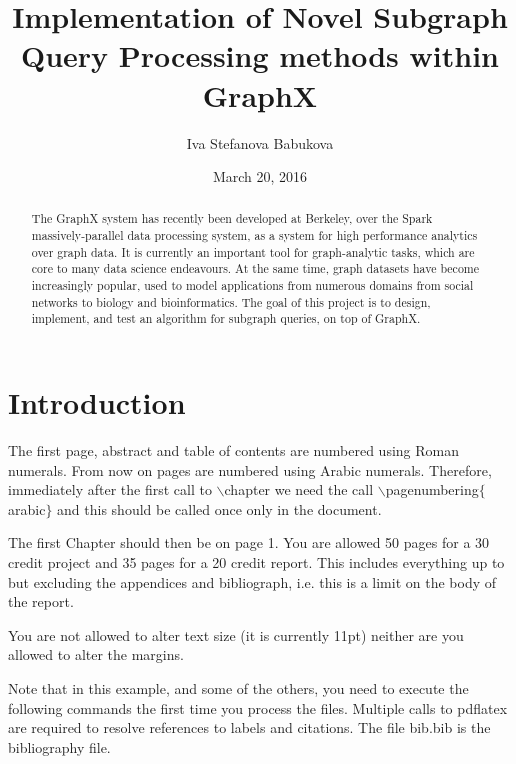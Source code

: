 \documentclass{l4proj}
\theoremstyle{definition}
\begin{document}
\title{Implementation of Novel Subgraph Query Processing methods within GraphX}
\author{Iva Stefanova Babukova}
\date{March 20, 2016}
\maketitle

\begin{abstract}
The GraphX system has recently been developed at Berkeley, over the Spark massively-parallel data processing system, as a system for high performance analytics over graph data. It is currently an important tool for graph-analytic tasks, which are core to many data science endeavours. 
At the same time, graph datasets have become increasingly popular, used to model applications from numerous domains from social networks to biology and bioinformatics. 
The goal of this project is to design, implement, and test an algorithm for subgraph queries, on top of GraphX.
\end{abstract}

\educationalconsent
%
%
\tableofcontents

\chapter{Introduction}
The first page, abstract and table of contents are numbered using Roman numerals. From now on pages are numbered
using Arabic numerals. Therefore, immediately after the first call to $\backslash$chapter we need the call
$\backslash$pagenumbering$\{$arabic$\}$ and this should be called once only in the document. 

The first Chapter should then be on page 1. You are allowed 50 pages for a 30 credit project and 35 pages for a 
20 credit report. This includes everything up to but excluding the appendices and bibliograph, i.e. this is a limit on
the body of the report.

You are not allowed to alter text size (it is currently 11pt) neither are you allowed to alter the margins.

Note that in this example, and some of the others, you need to execute the following commands the first time you process the files.
Multiple calls to pdflatex are required to resolve references to labels and citations. The file bib.bib is the bibliography file.
\end{document}
